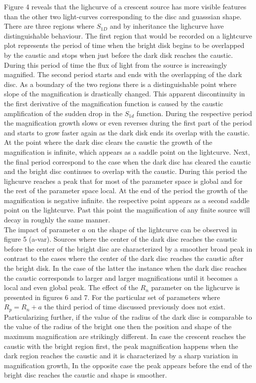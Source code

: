 \documentclass[usenatbib]{mn2e}
\begin{document}
Figure 4 reveals that the lighcurve of a crescent source has more visible features than the other two light-curves
corresponding to the disc and guasssian shape. There are three regions where $S_{1D}$ and by inheritance the lighcurve
 have distinguishable behaviour. The first region that would be recorded on a lightcurve plot represents the period
of time when the bright disk begins to be overlapped by the caustic and stops when just before the dark disk reaches
the caustic. During this period of time the flux of light from the source is increasingly magnified. The second
period starts and ends with the overlapping of the dark disc. As a boundary of the two regions there is a
distinguishable point where slope of the magnification is drastically changed. This apparent discontinuity in the
first derivative of the magnification function is caused by the caustic amplification of the sudden drop in the $S_{1d}$
function. During the respective period the magnification growth slows or even reverses during the first part of the
period and starts to grow faster again as the dark disk ends its overlap with the caustic. At the point where
the dark disc clears the caustic the growth of the magnification is infinite, which appears as a saddle point
on the lightcurve. Next, the final period correspond to the case when the dark disc has cleared the caustic
and the bright disc continues to overlap with the caustic. During this period the lighcurve reaches a peak
that for most of the parameter space is global and for the rest of the parameter space local.
At the end of the period the growth of the magnification is negative infinite. the respective point appears 
as a second saddle point on the lightcurve. Past this point the magnification of any finite source will 
decay in roughly the same manner. \\

The impact of parameter $a$ on the shape of the lightcurve can be observed in figure 5 (a-var). Sources where 
the center of the dark disc reaches the caustic before the center of the bright disc are characterized by a smoother
broad peak in contrast to the cases where the center of the dark disc reaches the caustic after the bright disk.
In the case of the latter the instance when the dark disc reaches the caustic corresponds to larger and
larger magnifications until it becomes a local and even global peak. The effect of the $R_n$  parameter on the
lighcurve is presented in figures 6 and 7. For the particular set of parameters where $R_p = R_n +a$ the third
period of time discussed previously does not exist. Particularizing further, if the value of the radius of the dark
disc is comparable to the value of the radius of the bright one then the position and shape of the maximum magnification
 are strikingly different. In case the crescent reaches the caustic with the bright region first, the peak magnification
 happens when the dark region reaches the caustic and it is characterized by a sharp variation in magnification growth,
In the opposite case the peak appears before the end of the bright disc reaches the caustic and shape is smoother. \\
\end{document}
